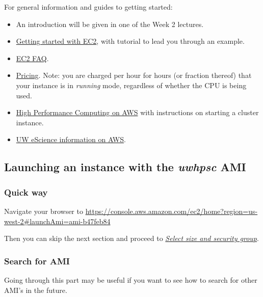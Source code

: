 \documentclass[letterpaper,10pt,english]{sphinxmanual}
\begin{document}
For general information and guides to getting started:
\begin{itemize}
\item {} 
An introduction will be given in one of the Week 2 lectures.

\item {} 
\href{http://docs.amazonwebservices.com/AWSEC2/latest/GettingStartedGuide/}{Getting started with EC2},
with tutorial to lead you through an example.

\item {} 
\href{http://aws.amazon.com/ec2/faqs}{EC2 FAQ}.

\item {} 
\href{http://aws.amazon.com/ec2/\#pricing}{Pricing}.  Note: you are charged
per hour for hours (or fraction thereof) that your instance is in
\emph{running} mode, regardless of whether the CPU is being used.

\item {} 
\href{http://aws.amazon.com/hpc-applications/}{High Performance Computing on AWS}
with instructions on starting a cluster instance.

\item {} 
\href{http://escience.washington.edu/get-help-now/get-started-amazon-web-services}{UW eScience information on AWS}.

\end{itemize}


\subsection{Launching an instance with the \emph{uwhpsc} AMI}
\label{aws:launching-an-instance-with-the-uwhpsc-ami}

\subsubsection{Quick way}
\label{aws:quick-way}
Navigate your browser to
\href{https://console.aws.amazon.com/ec2/home?region=us-west-2\#launchAmi=ami-b47feb84}{https://console.aws.amazon.com/ec2/home?region=us-west-2\#launchAmi=ami-b47feb84}

Then you can skip the next section and proceed to {\hyperref[aws:aws-select-size]{\emph{Select size and security group}}}.


\subsubsection{Search for AMI}
\label{aws:search-for-ami}
Going through this part may be useful if you want to see how to search for
other AMI's in the future.
\end{document}
